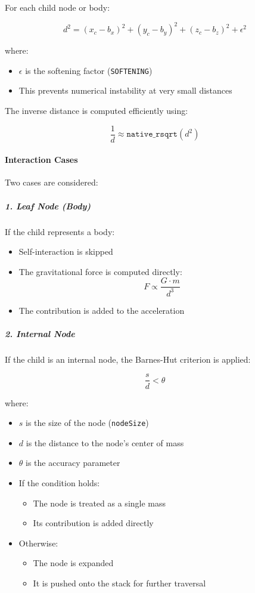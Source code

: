 \documentclass[12pt]{article}
\begin{document}
For each child node or body:

\[
d^2 = (x_c - b_x)^2 + (y_c - b_y)^2 + (z_c - b_z)^2 + \epsilon^2
\]

where:
\begin{itemize}
    \item \(\epsilon\) is the softening factor (\texttt{SOFTENING})
    \item This prevents numerical instability at very small distances
\end{itemize}

The inverse distance is computed efficiently using:

\[
\frac{1}{d} \approx \texttt{native\_rsqrt}(d^2)
\]

\paragraph{Interaction Cases}

Two cases are considered:

\subparagraph{1. Leaf Node (Body)}

If the child represents a body:

\begin{itemize}
    \item Self-interaction is skipped
    \item The gravitational force is computed directly:
    \[
    F \propto \frac{G \cdot m}{d^3}
    \]
    \item The contribution is added to the acceleration
\end{itemize}

\subparagraph{2. Internal Node}

If the child is an internal node, the Barnes-Hut criterion is applied:

\[
\frac{s}{d} < \theta
\]

where:
\begin{itemize}
    \item \(s\) is the size of the node (\texttt{nodeSize})
    \item \(d\) is the distance to the node's center of mass
    \item \(\theta\) is the accuracy parameter
\end{itemize}

\begin{itemize}
    \item If the condition holds:
    \begin{itemize}
        \item The node is treated as a single mass
        \item Its contribution is added directly
    \end{itemize}
    \item Otherwise:
    \begin{itemize}
        \item The node is expanded
        \item It is pushed onto the stack for further traversal
    \end{itemize}
\end{itemize}
\end{document}
